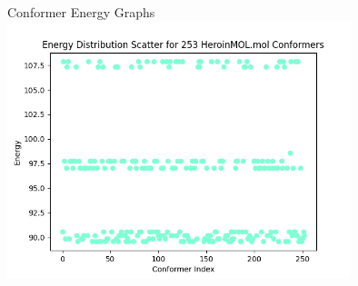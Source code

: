 \documentclass[aspectratio=169]{beamer}
\begin{document}
\begin{frame}{Conformer Energy Graphs}
\includegraphics[width=10cm]{img/Graphs/HeroinMOL_Energy_Scatter.png}
\end{frame}
\end{document}
